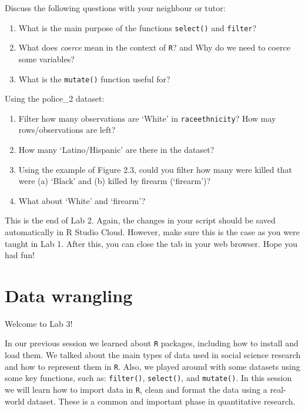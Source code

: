 \documentclass[
]{book}
\providecommand{\tightlist}{%
  \setlength{\itemsep}{0pt}\setlength{\parskip}{0pt}}
\begin{document}
Discuss the following questions with your neighbour or tutor:

\begin{enumerate}
\def\labelenumi{\arabic{enumi}.}
\tightlist
\item
  What is the main purpose of the functions \texttt{select()} and \texttt{filter}?
\item
  What does \emph{coerce} mean in the context of \texttt{R}? and Why do we need to coerce some variables?
\item
  What is the \texttt{mutate()} function useful for?
\end{enumerate}

Using the police\_2 dataset:

\begin{enumerate}
\def\labelenumi{\arabic{enumi}.}
\tightlist
\item
  Filter how many observations are `White' in \texttt{raceethnicity}? How may rows/observations are left?
\item
  How many `Latino/Hispanic' are there in the dataset?
\item
  Using the example of Figure 2.3, could you filter how many were killed that were (a) `Black' and (b) killed by firearm (`firearm')?
\item
  What about `White' and `firearm'?
\end{enumerate}

This is the end of Lab 2. Again, the changes in your script should be saved automatically in R Studio Cloud. However, make sure this is the case as you were taught in Lab 1. After this, you can close the tab in your web browser. Hope you had fun!

\hypertarget{data-wrangling-1}{%
\chapter{Data wrangling}\label{data-wrangling-1}}

Welcome to Lab 3!

In our previous session we learned about \texttt{R} packages, including how to install and load them. We talked about the main types of data used in social science research and how to represent them in \texttt{R}. Also, we played around with some datasets using some key functions, such as: \texttt{filter()}, \texttt{select()}, and \texttt{mutate()}. In this session we will learn how to import data in \texttt{R}, clean and format the data using a real-world dataset. These is a common and important phase in quantitative research.
\end{document}
